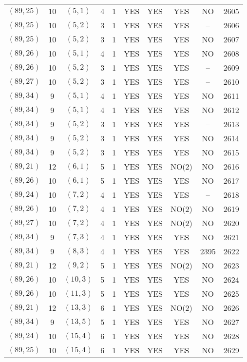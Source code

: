 \begin{longtable}{|c|c|c|c|c|c|c|c|c|c|}
$(89, 25)$ & 10 & $(5, 1)$ & 4 & 1 & YES & YES & YES & NO & 2605\\
$(89, 25)$ & 10 & $(5, 2)$ & 3 & 1 & YES & YES & YES & -- & 2606\\
$(89, 25)$ & 10 & $(5, 2)$ & 3 & 1 & YES & YES & YES & NO & 2607\\
$(89, 26)$ & 10 & $(5, 1)$ & 4 & 1 & YES & YES & YES & NO & 2608\\
$(89, 26)$ & 10 & $(5, 2)$ & 3 & 1 & YES & YES & YES & -- & 2609\\
$(89, 27)$ & 10 & $(5, 2)$ & 3 & 1 & YES & YES & YES & -- & 2610\\
$(89, 34)$ & 9 & $(5, 1)$ & 4 & 1 & YES & YES & YES & NO & 2611\\
$(89, 34)$ & 9 & $(5, 1)$ & 4 & 1 & YES & YES & YES & NO & 2612\\
$(89, 34)$ & 9 & $(5, 2)$ & 3 & 1 & YES & YES & YES & -- & 2613\\
$(89, 34)$ & 9 & $(5, 2)$ & 3 & 1 & YES & YES & YES & NO & 2614\\
$(89, 34)$ & 9 & $(5, 2)$ & 3 & 1 & YES & YES & YES & NO & 2615\\
$(89, 21)$ & 12 & $(6, 1)$ & 5 & 1 & YES & YES & NO(2) & NO & 2616\\
$(89, 26)$ & 10 & $(6, 1)$ & 5 & 1 & YES & YES & YES & NO & 2617\\
$(89, 24)$ & 10 & $(7, 2)$ & 4 & 1 & YES & YES & YES & -- & 2618\\
$(89, 26)$ & 10 & $(7, 2)$ & 4 & 1 & YES & YES & NO(2) & NO & 2619\\
$(89, 27)$ & 10 & $(7, 2)$ & 4 & 1 & YES & YES & NO(2) & NO & 2620\\
$(89, 34)$ & 9 & $(7, 3)$ & 4 & 1 & YES & YES & YES & NO & 2621\\
$(89, 34)$ & 9 & $(8, 3)$ & 4 & 1 & YES & YES & YES & 2395 & 2622\\
$(89, 21)$ & 12 & $(9, 2)$ & 5 & 1 & YES & YES & NO(2) & NO & 2623\\
$(89, 26)$ & 10 & $(10, 3)$ & 5 & 1 & YES & YES & YES & NO & 2624\\
$(89, 26)$ & 10 & $(11, 3)$ & 5 & 1 & YES & YES & YES & NO & 2625\\
$(89, 21)$ & 12 & $(13, 3)$ & 6 & 1 & YES & YES & NO(2) & NO & 2626\\
$(89, 34)$ & 9 & $(13, 5)$ & 5 & 1 & YES & YES & YES & NO & 2627\\
$(89, 24)$ & 10 & $(15, 4)$ & 6 & 1 & YES & YES & YES & NO & 2628\\
$(89, 25)$ & 10 & $(15, 4)$ & 6 & 1 & YES & YES & YES & NO & 2629\\

\end{longtable}
